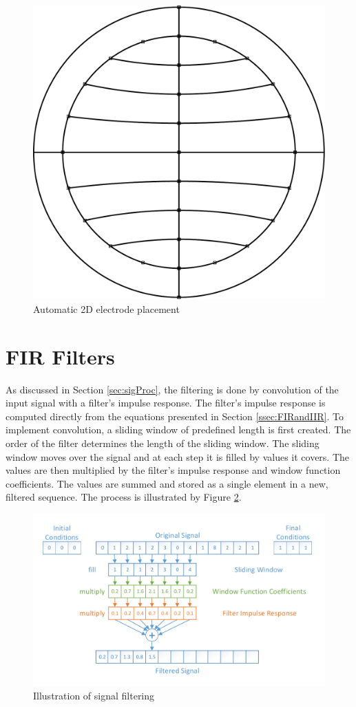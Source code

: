 \begin{figure}[htb]
	\centering
	\includegraphics[width=0.5\linewidth]{fig/2dplace.pdf}
	\caption{Automatic 2D electrode placement}
	\label{fig:2dplace}
\end{figure}

\section{FIR Filters}
\label{sec:implFIRfilters}
As discussed in Section \ref{sec:sigProc}, the filtering is done by convolution of the input signal with a filter's impulse response. The filter's impulse response is computed directly from the equations presented in Section \ref{ssec:FIRandIIR}. To implement convolution, a sliding window of predefined length is first created. The order of the filter determines the length of the sliding window. The sliding window moves over the signal and at each step it is filled by values it covers. The values are then multiplied by the filter's impulse response and window function coefficients. The values are summed and stored as a single element in a new, filtered sequence. The process is illustrated by Figure \ref{fig:ImplFilter}.

\begin{figure}[htb]
	\centering
	\includegraphics[width=1\linewidth]{fig/implFilter.pdf}
	\caption{Illustration of signal filtering}
	\label{fig:ImplFilter}
\end{figure}

